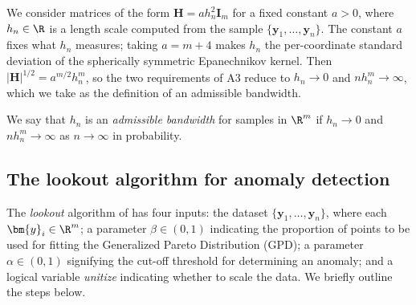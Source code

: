 We consider matrices of the form $\bm{H} = a h_n^2 \bm{I}_m$ for a fixed constant $a>0$, where $h_n\in\R$ is a length scale computed from the sample $\{\bm{y}_1,\dots,\bm{y}_n\}$. The constant $a$ fixes what $h_n$ measures; taking $a = m+4$ makes $h_n$ the per-coordinate standard deviation of the spherically symmetric Epanechnikov kernel. Then $|\bm{H}|^{1/2}=a^{m/2}h_n^m$, so the two requirements of A3 reduce to $h_n \rightarrow 0$ and $nh_n^m \rightarrow \infty$, which we take as the definition of an admissible bandwidth.

\begin{defn}\label{def:admissible_bandwidth}
  We say that $h_n$ is an \emph{admissible bandwidth} for samples in $\R^m$ if $h_n\rightarrow 0$ and $nh_n^m\rightarrow \infty$ as $n\rightarrow\infty$ in probability.
\end{defn}

\subsection{The lookout algorithm for anomaly detection}

The \textit{lookout} algorithm of \cite{lookout} has four inputs: the dataset $\{\bm{y}_1,\dots,\bm{y}_n\}$, where each $\bm{y}_i \in \R^m$; a parameter $\beta \in (0,1)$ indicating the proportion of points to be used for fitting the Generalized Pareto Distribution (GPD); a parameter $\alpha \in (0,1)$ signifying the cut-off threshold for determining an anomaly; and a logical variable \textit{unitize} indicating whether to scale the data. We briefly outline the steps below.

